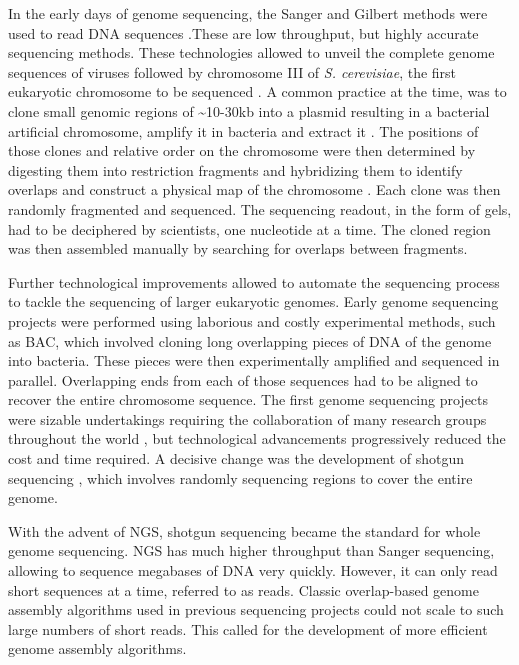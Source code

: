 In the early days of genome sequencing, the Sanger and Gilbert methods were used to read DNA sequences \cite{sangerDNASequencingChainterminating1977,maxamNewMethodSequencing1977}.These are low throughput, but highly accurate sequencing methods. These technologies allowed to unveil the complete genome sequences of viruses \citep{sangerNucleotideSequenceBacteriophage1982,baerDNASequenceExpression1984,vanwezenbeekNucleotideSequenceFilamentous1980} followed by chromosome III of \textit{S. cerevisiae}, the first eukaryotic chromosome to be sequenced \cite{oliverCompleteDNASequence1992}. A common practice at the time, was to clone small genomic regions of \textasciitilde 10-30kb into a plasmid resulting in a bacterial artificial chromosome, amplify it in bacteria and extract it \cite{thierryCompleteSequenceKb1990}. The positions of those clones and relative order on the chromosome were then determined by digesting them into restriction fragments and hybridizing them to identify overlaps and construct a physical map of the chromosome \cite{mcphersonPhysicalMapHuman2001}. Each clone was then randomly fragmented and sequenced. The sequencing readout, in the form of gels, had to be deciphered by scientists, one nucleotide at a time. The cloned region was then assembled manually by searching for overlaps between fragments.

Further technological improvements allowed to automate the sequencing process to tackle the sequencing of larger eukaryotic genomes. Early genome sequencing projects were performed using laborious and costly experimental methods, such as \acrfull{BAC}, which involved cloning long overlapping pieces of DNA of the genome into bacteria. These pieces were then experimentally amplified and sequenced in parallel. Overlapping ends from each of those sequences had to be aligned to recover the entire chromosome sequence. The first genome sequencing projects were sizable undertakings requiring the collaboration of many research groups throughout the world \citep{collinsNewFiveyearPlan1993,adamsGenomeSequenceDrosophila2000,oliverCompleteDNASequence1992}, but technological advancements progressively reduced the cost and time required. A decisive change was the development of shotgun sequencing \cite{venterSequenceHumanGenome2001}, which involves randomly sequencing regions to cover the entire genome.

With the advent of \acrfull{NGS}, shotgun sequencing became the standard for whole genome sequencing. \acrshort{NGS} has much higher throughput than Sanger sequencing, allowing to sequence megabases of DNA very quickly. However, it can only read short sequences at a time, referred to as \Gls{read}s. Classic overlap-based genome assembly algorithms used in previous sequencing projects could not scale to such large numbers of short reads. This called for the development of more efficient genome assembly algorithms.

